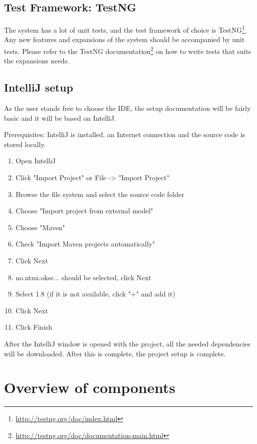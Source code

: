 \subsection{Test Framework: TestNG}
The system has a lot of unit tests, and the test framework of choice is TestNG\footnote{\url{http://testng.org/doc/index.html}}. Any new features and expansions of the system should be accompanied by unit tests. Please refer to the TestNG documentation\footnote{\url{http://testng.org/doc/documentation-main.html}} on how to write tests that suits the expansions needs.

\subsection{IntelliJ setup}
As the user stands free to choose the IDE, the setup documentation will be fairly basic and it will be based on IntelliJ.

Prerequisites: IntelliJ is installed, an Internet connection and the source code is stored locally.

\begin{enumerate}
\setlength{\itemsep}{0cm}%
    \item Open IntelliJ
    \item Click "Import Project" or File -> "Import Project"
    \item Browse the file system and select the source code folder
    \item Choose "Import project from external model"
    \item Choose "Maven"
    \item Check "Import Maven projects automatically"
    \item Click Next
    \item no.ntnu.okse... should be selected, click Next
    \item Select 1.8 (if it is not available, click "+" and add it)
    \item Click Next
    \item Click Finish
\end{enumerate}

After the IntelliJ window is opened with the project, all the needed dependencies will be downloaded. After this is complete, the project setup is complete.

\section{Overview of components}


